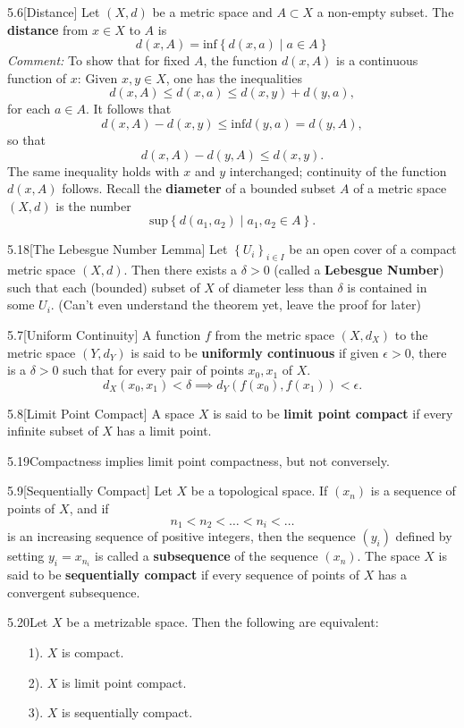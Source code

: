 \begin{customdefinition}{5.6}[Distance]
Let $(X, d)$ be a metric space and $A \subset X$ a non-empty subset. The {\bf distance} from $x \in X$ to $A$ is 
$$d(x, A) = \text{inf}\left\{d(x, a) \mid a \in A\right\}$$
\emph{Comment:} To show that for fixed $A$, the function $d(x, A)$ is a continuous function of $x$: Given $x, y \in X$, one has the inequalities 
$$d(x, A) \leqslant d(x, a) \leqslant d(x, y) + d(y, a),$$
for each $a \in A$. It follows that 
$$d(x, A) - d(x,y) \leqslant \text{inf} d(y, a) = d(y, A),$$
so that 
$$d(x, A) - d(y, A) \leqslant d(x, y).$$
The same inequality holds with $x$ and $y$ interchanged; continuity of the function $d(x,A)$ follows. Recall the {\bf diameter} of a bounded subset $A$ of a metric space $(X, d)$ is the number 
$$\text{sup}\left\{d(a_1, a_2) \mid a_1, a_2 \in A\right\}.$$
\end{customdefinition}

\begin{customthm}{5.18}[The Lebesgue Number Lemma] Let $\left\{U_i\right\}_{i \in I}$ be an open cover of a compact metric space $(X, d)$. Then there exists a $\delta > 0$ (called a {\bf Lebesgue Number}) such that each (bounded) subset of $X$ of diameter less than $\delta$ is contained in some $U_i$. (Can't even understand the theorem yet, leave the proof for later)
\end{customthm}

\begin{customdefinition}{5.7}[Uniform Continuity]
A function $f$ from the metric space $(X, d_X)$ to the metric space $(Y, d_Y)$ is said to be {\bf uniformly continuous} if given $\epsilon > 0$, there is a $\delta > 0$ such that for every pair of points $x_0, x_1$ of $X$.
$$d_X\left(x_0, x_1\right) < \delta \implies d_Y\left(f(x_0), f(x_1)\right) < \epsilon.$$
\end{customdefinition}

\begin{customdefinition}{5.8}[Limit Point Compact]
A space $X$ is said to be {\bf limit point compact} if every infinite subset of $X$ has a limit point.
\end{customdefinition}

\begin{customthm}{5.19}Compactness implies limit point compactness, but not conversely.
\end{customthm}

\begin{customdefinition}{5.9}[Sequentially Compact]
Let $X$ be a topological space. If $(x_n)$ is a sequence of points of $X$, and if 
$$n_1 < n_2 < \dots < n_i < \dots $$
is an increasing sequence of positive integers, then the sequence $(y_i)$ defined by setting $y_i = x_{n_i}$ is called a {\bf subsequence} of the sequence $(x_n)$. The space $X$ is said to be {\bf sequentially compact} if every sequence of points of $X$ has a convergent subsequence.
\end{customdefinition}

\begin{customthm}{5.20}Let $X$ be a metrizable space. Then the following are equivalent:
\begin{enumerate}
    \item[1).] $X$ is compact.
    \item[2).] $X$ is limit point compact.
    \item[3).] $X$ is sequentially compact.
\end{enumerate}
\end{customthm}